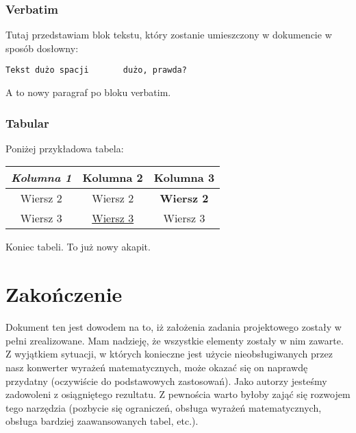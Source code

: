 \documentclass[10pt,a4paper]{article}
\begin{document}
\subsubsection{Verbatim}
Tutaj przedstawiam blok tekstu, który zostanie umieszczony w dokumencie w sposób dosłowny:
\begin{verbatim}
Tekst dużo spacji       dużo, prawda?
\end{verbatim}
A to nowy paragraf po bloku verbatim.

\subsubsection{Tabular}
Poniżej przykładowa tabela: \newline
\begin{tabular}{|c|c|c|}
	\hline
	\emph{Kolumna 1} & Kolumna 2 & Kolumna 3 \\ \hline
	Wiersz 2 & Wiersz 2 & \textbf{Wiersz 2} \\ \hline
	Wiersz 3 & \underline{Wiersz 3} & Wiersz 3 \\
	\hline
\end{tabular}
\newline
Koniec tabeli. To już nowy akapit.


\section{Zakończenie}
Dokument ten jest dowodem na to, iż założenia zadania projektowego zostały w pełni zrealizowane. Mam nadzieję, że wszystkie elementy zostały w nim zawarte. Z wyjątkiem sytuacji, w których konieczne jest użycie nieobsługiwanych przez nasz konwerter wyrażeń matematycznych, może okazać się on naprawdę przydatny (oczywiście do podstawowych zastosowań). Jako autorzy jesteśmy zadowoleni z osiągniętego rezultatu. Z pewnościa warto byłoby zająć się rozwojem tego narzędzia (pozbycie się ograniczeń, obsługa wyrażeń matematycznych, obsługa bardziej zaawansowanych tabel, etc.).
\end{document}
